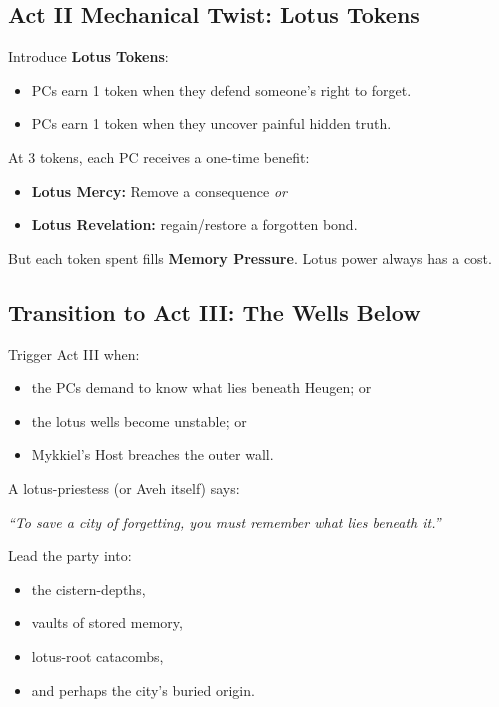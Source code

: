 \documentclass[11pt]{article}
\newcommand{\Term}[1]{\textbf{#1}}
\begin{document}
\bigskip

\subsection*{Act II Mechanical Twist: Lotus Tokens}

Introduce \textbf{Lotus Tokens}:

\begin{itemize}[leftmargin=*]
  \item PCs earn 1 token when they defend someone's right to forget.
  \item PCs earn 1 token when they uncover painful hidden truth.
\end{itemize}

At 3 tokens, each PC receives a one-time benefit:
\begin{itemize}[leftmargin=*]
  \item \Term{Lotus Mercy:} Remove a consequence \emph{or}
  \item \Term{Lotus Revelation:} regain/restore a forgotten bond.
\end{itemize}

But each token spent fills \Term{Memory Pressure}.  
Lotus power always has a cost.

\bigskip

\subsection*{Transition to Act III: The Wells Below}

Trigger Act III when:
\begin{itemize}[leftmargin=*]
  \item the PCs demand to know what lies beneath Heugen; or
  \item the lotus wells become unstable; or
  \item Mykkiel's Host breaches the outer wall.
\end{itemize}

A lotus-priestess (or Aveh itself) says:

\begin{center}
  \emph{``To save a city of forgetting, you must remember what lies beneath it.''}
\end{center}

Lead the party into:
\begin{itemize}[leftmargin=*]
  \item the cistern-depths,
  \item vaults of stored memory,
  \item lotus-root catacombs,
  \item and perhaps the city's buried origin.
\end{itemize}
\end{document}

